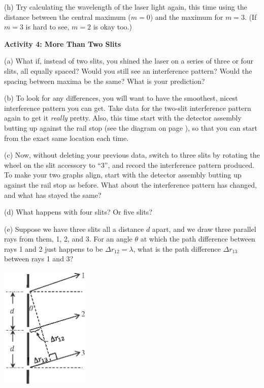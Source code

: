 (h) Try calculating the wavelength of the laser light again, this time using the distance between the central maximum ($m=0$) and the maximum for $m=3$.  (If $m=3$ is hard to see, $m=2$ is okay too.)
\answerspace{0.9in}


\pagebreak[2]
\textbf{Activity 4: More Than Two Slits}

(a) What if, instead of two slits, you shined the laser on a series of three or four slits, all equally spaced?  Would you still see an interference pattern?  Would the spacing between maxima be the same?  What is your prediction?
\answerspace{0.8in}

(b) To look for any differences, you will want to have the smoothest, nicest interference pattern you can get.  Take data for the two-slit interference pattern again to get it \textit{really} pretty.  Also, this time start with the detector assembly butting up against the rail stop (see the diagram on page \pageref{figure_rail_stop}), so that you can start from the exact same location each time.

(c) Now, without deleting your previous data, switch to three slits by rotating the wheel on the slit accessory 
to ``3'', and record the interference pattern produced.
To make your two graphs align, start with the detector assembly butting up against the rail stop as before.  
What about the interference pattern has changed, and what has stayed the same?
\answerspace{0.8in}

(d) What happens with four slits?  Or five slits?
\answerspace{0.8in}

(e) Suppose we have three slits all a distance $d$ apart, and we draw three parallel rays from them, 1, 2, and 3.  For an angle $\theta$ at which the path difference between rays 1 and 2 just happens to be $\Delta r_{12} = \lambda$, what is the path difference $\Delta r_{13}$ between rays 1 and 3?

\hspace{0.5in}\includegraphics[width=1.7in]{interference_of_light/three_slits.eps}

